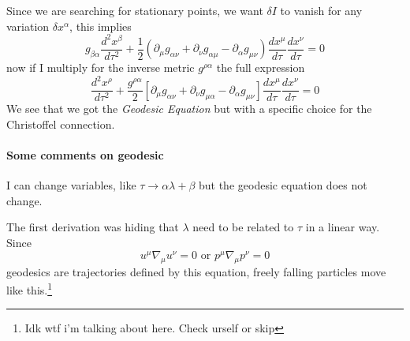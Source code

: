Since we are searching for stationary points, we want $\delta I$ to vanish for any variation $\delta x^{\alpha } $, this implies 
\begin{equation}
g_{\beta \alpha } \frac{d ^{2}x^{\beta }}{d \tau ^{2}} + \frac{1}{2} \left( \partial_{\mu }g_{\alpha \nu } + \partial_{\nu } g_{\alpha \mu } - \partial_{\alpha }g_{\mu \nu } \right) \frac{d x^{\mu }}{d \tau } \frac{d x^{\nu }}{d \tau } = 0
\end{equation}
now if I multiply for the inverse metric $g^{\rho \alpha }$ the full expression
\begin{equation}
	\frac{d ^{2}x^{\rho }}{d \tau ^{2}} + \frac{g^{\rho \alpha }}{2} \left[ \partial_{\mu }g_{\alpha \nu } + \partial_{\nu } g_{\mu \alpha } - \partial_{\alpha } g_{\mu \nu }\right] \frac{d x^{\mu }}{d \tau }\frac{d x^{\nu }}{d \tau } = 0
\end{equation}
We see that we got the \emph{Geodesic Equation} but with a specific choice for the Christoffel connection.\par

\paragraph{Some comments on geodesic}
I can change variables, like $\tau \to \alpha \lambda + \beta $ but the geodesic equation does not change.\par

The first derivation was hiding that $ \lambda $ need to be related to $\tau $ in a linear way. Since
\begin{equation}
u^{\mu }\nabla _{\mu }u^{\nu } = 0 \text{ or  } p^{\mu }\nabla _{\mu }p^{\nu } = 0
\end{equation}
geodesics are trajectories defined by this equation, freely falling particles move like this.\footnote{Idk wtf i'm talking about here. Check urself or skip}


































